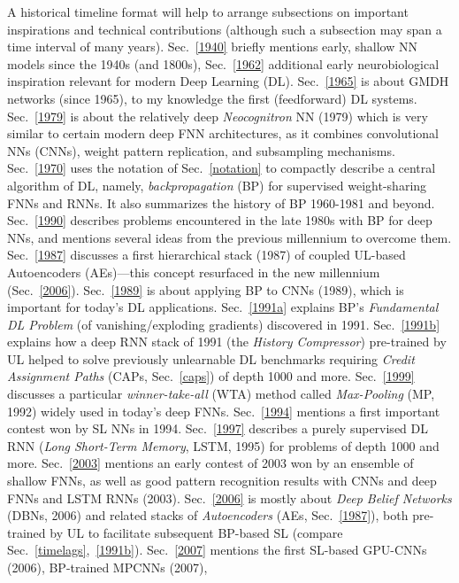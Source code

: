 \documentclass[letterpaper]{article}
\begin{document}
\begin{CJK*}{UTF8}{gbsn}
\begin{sloppypar}
A historical timeline format will help to arrange 
subsections on
important inspirations and technical contributions
(although such a subsection may span a time interval of many years).
Sec.~\ref{1940} briefly mentions early, shallow NN models since the 1940s (and 1800s),
Sec.~\ref{1962} additional early neurobiological inspiration relevant for modern Deep Learning (DL).
Sec.~\ref{1965} is about GMDH networks  (since 1965), 
to my knowledge the first (feedforward) DL systems.
Sec.~\ref{1979} is about the relatively deep {\em Neocognitron} NN (1979)
which is very similar to certain modern deep FNN architectures, as it
combines convolutional NNs (CNNs), weight pattern replication, and subsampling mechanisms.
Sec.~\ref{1970} uses the notation of Sec.~\ref{notation} to compactly 
describe a central algorithm of DL, namely,
{\em backpropagation} (BP) for 
supervised weight-sharing FNNs and RNNs. It also summarizes
 the history of BP 1960-1981 and beyond.
Sec.~\ref{1990} describes problems encountered in the late 1980s with BP for deep NNs,
and mentions several ideas from the previous millennium  to overcome them.
Sec.~\ref{1987} discusses a first hierarchical stack (1987) of coupled UL-based Autoencoders (AEs)---this concept
resurfaced in the
new millennium (Sec.~\ref{2006}). 
Sec.~\ref{1989} is about applying BP to CNNs (1989), which is important for today's DL applications.
Sec.~\ref{1991a} explains BP's {\em Fundamental DL Problem} (of vanishing/exploding gradients)
discovered in 1991.
Sec.~\ref{1991b} explains how a deep RNN stack of 1991 (the {\em History Compressor}) pre-trained by UL helped to solve previously unlearnable DL benchmarks 
requiring {\em Credit Assignment Paths} (CAPs, Sec.~\ref{caps}) of depth 1000 and more.
Sec.~\ref{1999} discusses a particular {\em winner-take-all} (WTA) method called {\em Max-Pooling} (MP, 1992)  widely used in today's deep FNNs.
Sec.~\ref{1994} mentions a first important contest won by SL NNs in 1994.
Sec.~\ref{1997} describes a purely supervised DL RNN ({\em Long Short-Term Memory}, LSTM, 1995) for problems of depth 1000 and more.
Sec.~\ref{2003} mentions an early contest of 2003 
won by an ensemble of shallow FNNs, as well as
good pattern recognition results with CNNs and deep FNNs and LSTM RNNs (2003). 
Sec.~\ref{2006} is mostly about {\em Deep Belief Networks} (DBNs, 2006) and related stacks of {\em  Autoencoders} (AEs, Sec.~\ref{1987}), both pre-trained by UL to facilitate subsequent BP-based SL (compare Sec.~\ref{timelags},~\ref{1991b}). 
Sec.~\ref{2007} mentions the first SL-based  GPU-CNNs (2006),  BP-trained MPCNNs (2007),

\end{sloppypar}
\end{CJK*}
\end{document}
